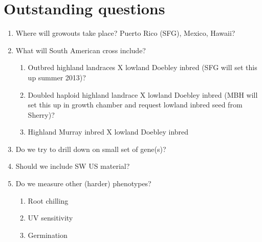 \documentclass[]{article}
\begin{document}
\section*{Outstanding questions}
\begin{enumerate}
	\item Where will growouts take place?  Puerto Rico (SFG), Mexico, Hawaii?

	\item What will South American cross include?  
	\begin{enumerate}
		\item Outbred highland landraces X lowland Doebley inbred (SFG will set this up summer 2013)? 
		\item Doubled haploid highland landrace X lowland Doebley inbred (MBH will set this up in growth chamber and request lowland inbred seed from Sherry)?
		\item Highland Murray inbred X lowland Doebley inbred
	\end{enumerate}
	\item Do we try to drill down on small set of gene(s)?
	\item Should we include SW US material?



	\item  Do we measure other (harder) phenotypes?
	\begin{enumerate}
		\item Root chilling
		\item UV sensitivity
		\item Germination
	\end{enumerate}

\end{enumerate}
\end{document}
